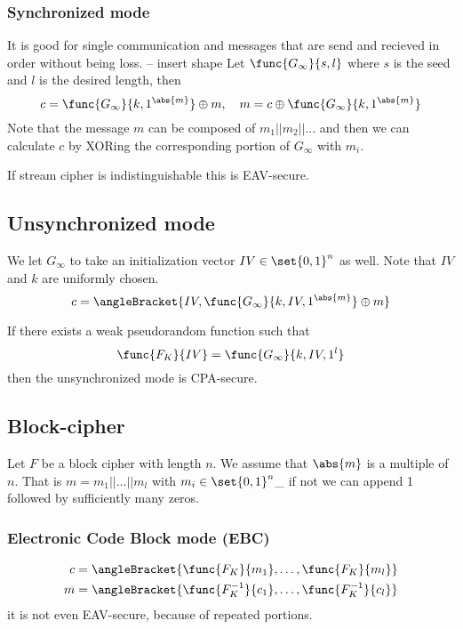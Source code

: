 \subsubsection{Synchronized mode}
It is good for single communication and messages that are send and recieved in order without being loss. 
-- insert shape
Let \(\func{G_{\infty}}{s , l}\) where \(s\) is the seed and \(l\) is the desired length, then
\begin{equation*}
    c = \func{G_{\infty}}{k,1^{\abs{m}}} \oplus m , \quad m = c \oplus \func{G_{\infty}}{k,1^{\abs{m}}}
\end{equation*}
Note that the message \(m\) can be composed of \(m_1 || m_2 || \dots \) and then we can calculate \(c\) by XORing the corresponding portion of \(G_{\infty}\) with \(m_i\). 
\begin{proposition}
    If stream cipher is indistinguishable this is EAV-secure.
\end{proposition}
\subsection{Unsynchronized mode}
We let \(G_{\infty}\) to take an initialization vector \(IV \in \set{0,1}^n\) as well. Note that \(IV\) and \(k\) are uniformly chosen. 
\begin{equation*}
    c = \angleBracket{IV, \func{G_{\infty}}{k,IV, 1^{\abs{m}}} \oplus m}
\end{equation*}
\begin{proposition}
    If there exists a weak pseudorandom function such that 
    \begin{equation*}
        \func{F_K}{IV} = \func{G_{\infty}}{k , IV, 1^l}
    \end{equation*}
    then the unsynchronized mode is CPA-secure.
\end{proposition}

\subsection{Block-cipher}
Let \(F\) be a block cipher with length \(n\). We assume that \(\abs{m}\) is a multiple of \(n\). That is \(m = m_1 || \dots || m_l\) with \(m_i \in \set{0,1}^n\)\_ if not we can append 1 followed by sufficiently many zeros.

\subsubsection{Electronic Code Block mode (EBC)}
\begin{align*}
    c &= \angleBracket{\func{F_K}{m_1}, \dots , \func{F_K}{m_l}}\\
    m &= \angleBracket{\func{F_K^{-1}}{c_1}, \dots , \func{F_K^{-1}}{c_l}}
\end{align*}
it is not even EAV-secure, because of repeated portions.


